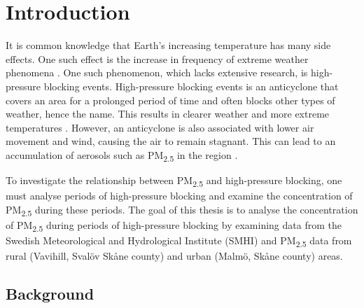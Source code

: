 \section{Introduction}
It is common knowledge that Earth's increasing temperature has many side effects. One such effect is the increase in frequency of extreme weather phenomena \cite{mitchellExtremeEventsDue2006}. One such phenomenon, which lacks extensive research, is high-pressure blocking events. High-pressure blocking events is an anticyclone that covers an area for a prolonged period of time and often blocks other types of weather, hence the name. This results in clearer weather and more extreme temperatures \cite{lupoAtmosphericBlockingEvents2020}. However, an anticyclone is also associated with lower air movement and wind, causing the air to remain stagnant. This can lead to an accumulation of aerosols such as PM\textsubscript{2.5} in the region \cite{caiImpactBlockingStructure2020}.

To investigate the relationship between PM\textsubscript{2.5} and high-pressure blocking, one must analyse periods of high-pressure blocking and examine the concentration of PM\textsubscript{2.5} during these periods. The goal of this thesis is to analyse the concentration of PM\textsubscript{2.5} during periods of high-pressure blocking by examining data from the Swedish Meteorological and Hydrological Institute (SMHI) and PM\textsubscript{2.5} data from rural (Vavihill, Svalöv Skåne county) and urban (Malmö, Skåne county) areas.

\subsection{Background} 